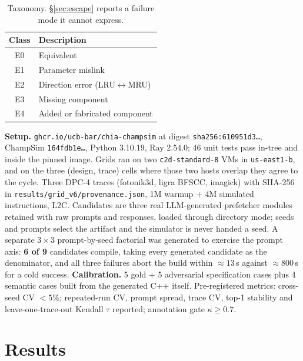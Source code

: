 \documentclass[10pt,twocolumn]{article}
\begin{document}
\begin{table}[h]
\vspace{-0.6em}
\centering\small
\begin{tabular}{cl}
\toprule
\textbf{Class} & \textbf{Description} \\
\midrule
E0 & Equivalent \\
E1 & Parameter mislink \\
E2 & Direction error (LRU$\leftrightarrow$MRU) \\
E3 & Missing component \\
E4 & Added or fabricated component \\
\bottomrule
\end{tabular}
\vspace{-0.4em}
\caption{Taxonomy. \S\ref{sec:escape} reports a failure mode it cannot express.}
\label{tab:errors}
\end{table}

\textbf{Setup.} \texttt{ghcr.io/ucb-bar/chia-champsim} at digest
\texttt{sha256:610951d3\ldots}, ChampSim \texttt{164fdb1e\ldots}, Python 3.10.19,
Ray 2.54.0; 46 unit tests pass in-tree and inside the pinned image. Grids ran on two
\texttt{c2d-standard-8} VMs in \texttt{us-east1-b}, and on the three
(design, trace) cells where those two hosts overlap they agree to the cycle.
Three DPC-4 traces (fotonik3d, ligra BFSCC, imagick) with
SHA-256 in \texttt{results/grid\_v6/provenance.json}, 1M warmup + 4M simulated
instructions, L2C. Candidates are three real LLM-generated prefetcher modules
retained with raw prompts and responses, loaded through directory mode; seeds and
prompts select the artifact and the simulator is never handed a seed. A separate
$3{\times}3$ prompt-by-seed factorial was generated to exercise the prompt axis:
\textbf{6 of 9} candidates compile, taking every generated candidate as the
denominator, and all three failures abort the build within ${\approx}13$\,s
against ${\approx}800$\,s for a cold success.
\textbf{Calibration.} 5 gold + 5 adversarial specification cases plus 4
semantic cases built from the generated C++ itself. Pre-registered metrics:
cross-seed CV $<5\%$; repeated-run CV, prompt spread, trace CV, top-1 stability and
leave-one-trace-out Kendall $\tau$ reported; annotation gate $\kappa\geq0.7$.

\section{Results}
\label{sec:results}
\end{document}
